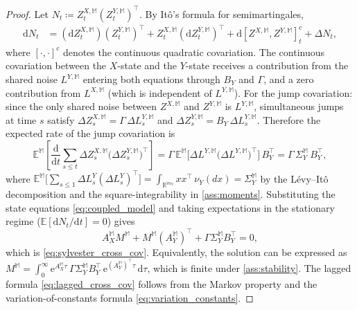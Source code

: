 \documentclass[10pt,a4paper,reqno]{amsart}
\newcommand{\1}{\mathbbm{1}}
\newcommand{\dd}{\mathrm{d}}
\newcommand{\ee}{\mathrm{e}}
\begin{document}
\begin{proof}
Let $N_t \coloneqq Z_t^{X,\mathbb{M}}(Z_t^{Y,\mathbb{M}})^\top$. By Itô's
formula for semimartingales,
\begin{align*}
  \dd N_t
  &= (\dd Z_t^{X,\mathbb{M}})(Z_t^{Y,\mathbb{M}})^\top
     + Z_t^{X,\mathbb{M}}(\dd Z_t^{Y,\mathbb{M}})^\top
     + \dd [Z^{X,\mathbb{M}}, Z^{Y,\mathbb{M}}]_t^c + \Delta N_t,
\end{align*}
where $[{\cdot},{\cdot}]^c$ denotes the continuous quadratic covariation.
The continuous covariation between the $X$-state and the $Y$-state receives
a contribution from the shared noise $L^{Y,\mathbb{M}}$ entering both
equations through $B_Y$ and $\Gamma$, and a zero contribution from
$L^{X,\mathbb{M}}$ (which is independent of $L^{Y,\mathbb{M}}$).
For the jump covariation: since the only shared noise between $Z^{X,\mathbb{M}}$
and $Z^{Y,\mathbb{M}}$ is $L^{Y,\mathbb{M}}$, simultaneous jumps at time $s$
satisfy $\Delta Z_s^{X,\mathbb{M}} = \Gamma\,\Delta L_s^{Y,\mathbb{M}}$ and
$\Delta Z_s^{Y,\mathbb{M}} = B_Y\,\Delta L_s^{Y,\mathbb{M}}$.
Therefore the expected rate of the jump covariation is
$$
  \mathbb{E}^{\mathbb{M}}\!\left[
    \frac{\dd}{\dd t}\sum_{s \le t}
      \Delta Z_s^{X,\mathbb{M}}\bigl(\Delta Z_s^{Y,\mathbb{M}}\bigr)^\top
  \right]
  = \Gamma\,
    \mathbb{E}^{\mathbb{M}}\!\bigl[
      \Delta L^{Y,\mathbb{M}}\bigl(\Delta L^{Y,\mathbb{M}}\bigr)^\top
    \bigr]\,
    B_Y^\top
  = \Gamma\,\Sigma_Y^{\mathbb{M}}\,B_Y^\top,
$$
where
$\mathbb{E}^{\mathbb{M}}\bigl[\sum_{s\le 1}\Delta L^Y_s(\Delta L^Y_s)^\top\bigr]
= \int_{\mathbb{R}^{m_Y}} x x^\top\,\nu_Y(dx) = \Sigma_Y^{\mathbb{M}}$
by the Lévy--Itô decomposition and the square-integrability in
\ref{ass:moments}.
Substituting the state equations \eqref{eq:coupled_model} and taking
expectations in the stationary regime
($\mathbb{E}[\dd N_t/\dd t] = 0$) gives
$$
  A_X^{\mathbb{M}} M^{\mathbb{M}}
  + M^{\mathbb{M}} (A_Y^{\mathbb{M}})^\top
  + \Gamma \Sigma_Y^{\mathbb{M}} B_Y^\top
  = 0,
$$
which is \eqref{eq:sylvester_cross_cov}. Equivalently, the solution can be
expressed as
$M^{\mathbb{M}} = \int_0^\infty \ee^{A_X^{\mathbb{M}} \tau}\,
\Gamma \Sigma_Y^{\mathbb{M}} B_Y^\top\,
\ee^{(A_Y^{\mathbb{M}})^\top \tau}\,\dd\tau$,
which is finite under \ref{ass:stability}. The lagged
formula \eqref{eq:lagged_cross_cov} follows from the Markov property and the
variation-of-constants formula \eqref{eq:variation_constants}.
\end{proof}
\end{document}
